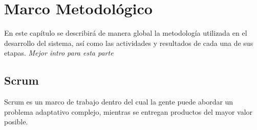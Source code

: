 \chapter{Marco Metodológico}

En este capítulo se describirá de manera global la metodología utilizada en el desarrollo del sistema, así como las actividades y resultados de cada una de sus etapas. \textit{Mejor intro para esta parte}

\section{Scrum}
Scrum es un marco de trabajo dentro del cual la gente puede abordar un problema adaptativo complejo, mientras se entregan productos del mayor valor posible. \cite{scrumSchwaber}